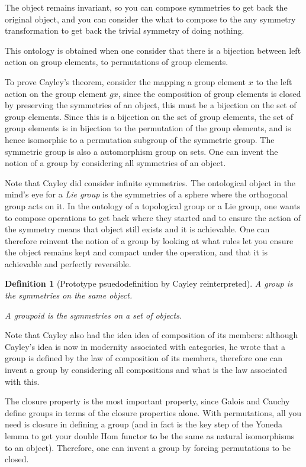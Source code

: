\documentclass{tufte-book}
\newtheorem{definition}[theorem]{Definition}
\begin{document}
The object remains invariant, so you can compose symmetries to get back the original object, and you can consider the what to compose to the any symmetry transformation to get back the trivial symmetry of doing nothing. 

This ontology is obtained when one consider that there is a bijection between left action on group elements, to permutations of group elements. 

To prove Cayley's theorem, consider the mapping a group element $x$ to the left action on the group element $gx$, since the composition of group elements is closed by preserving the symmetries of an object, this must be a bijection on the set of group elements. Since this is a bijection on the set of group elements, the set of group elements is in bijection to the permutation of the group elements, and is hence isomorphic to a permutation subgroup of the symmetric group. The symmetric group is also a automorphism group on sets. One can invent the notion of a group by considering all symmetries of an object.

Note that Cayley did consider infinite symmetries. The ontological object in the mind's eye for a \textit{Lie group} is the symmetries of a sphere where the orthogonal group acts on it. In the ontology of a topological group or a Lie group, one wants to compose operations to get back where they started and to ensure the action of the symmetry means that object still exists and it is achievable. One can therefore reinvent the notion of a group by looking at what rules let you ensure the object remains kept and compact under the operation, and that it is achievable and perfectly reversible.

\begin{definition}[Prototype psuedodefinition by Cayley reinterpreted]
  A group is the symmetries on the same object.
  
  A groupoid is the symmetries on a set of objects.
\end{definition}

Note that Cayley also had the idea idea of composition of its members: although Cayley's idea is now in modernity associated with categories, he wrote that a group is defined by the law of composition of its members, therefore one can invent a group by considering all compositions and what is the law associated with this.

The closure property is the most important property, since Galois and Cauchy define groups in terms of the closure properties alone. With permutations, all you need is closure in defining a group (and in fact is the key step of the Yoneda lemma to get your double Hom functor to be the same as natural isomorphisms to an object). Therefore, one can invent a group by forcing permutations to be closed.
\end{document}
